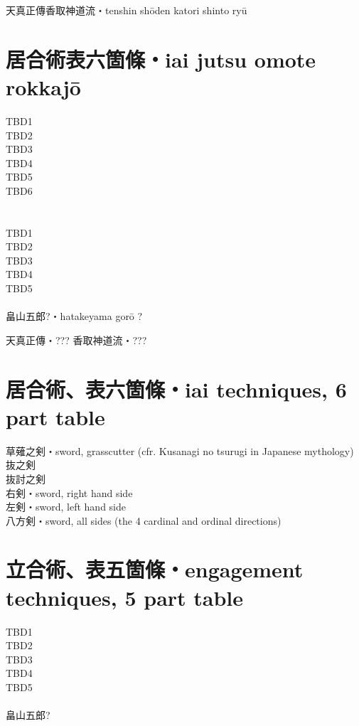 \documentclass[dvipdfmx, a4paper, 12pt]{utarticle}
\begin{document}
\begin{CJK*}{UTF8}{min}
\begin{landscape}
\setcounter{section}{0}
\newpage
\pagestyle{empty}
天真正傳香取神道流・tenshin sh\={o}den katori shinto ry\={u}
\section{居合術表六箇條・iai jutsu omote rokkaj\={o}}
\noindent TBD1\\
TBD2\\
TBD3\\
TBD4\\
TBD5\\
TBD6\\
\section{}
\noindent TBD1\\
TBD2\\
TBD3\\
TBD4\\
TBD5\\
\\
畠山五郎?・hatakeyama gor\={o} ?

\setcounter{section}{0}
\newpage
\pagestyle{empty}
天真正傳・???
香取神道流・???
\section{居合術、表六箇條・iai techniques, 6 part table}
\noindent 草薙之剣・sword, grasscutter (cfr. Kusanagi no tsurugi in Japanese mythology)\\
抜之剣\\
抜討之剣\\
右剣・sword, right hand side\\
左剣・sword, left hand side\\
八方剣・sword, all sides (the 4 cardinal and ordinal directions)\\
\section{立合術、表五箇條・engagement techniques, 5 part table}
\noindent TBD1\\
TBD2\\
TBD3\\
TBD4\\
TBD5\\
\\
畠山五郎?



\end{landscape}
\end{CJK*}
\end{document}
